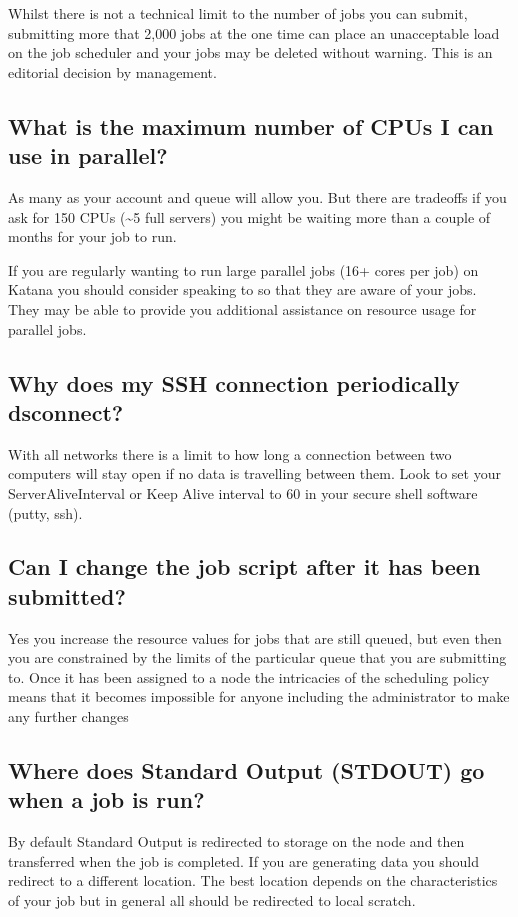 \documentclass[letterpaper,10pt,english]{sphinxmanual}
\begin{document}
Whilst there is not a technical limit to the number of jobs you can submit, submitting more that 2,000 jobs at the one time can place an unacceptable load on the job scheduler and your jobs may be deleted without warning. This is an editorial decision by management.


\subsection{What is the maximum number of CPUs I can use in parallel?}
\label{\detokenize{faq:what-is-the-maximum-number-of-cpus-i-can-use-in-parallel}}
As many as your account and queue will allow you. But there are trade\sphinxhyphen{}offs \sphinxhyphen{} if you ask for 150 CPUs (\textasciitilde{}5 full servers) you might be waiting more than a couple of months for your job to run.

If you are regularly wanting to run large parallel jobs (16+ cores per job) on Katana you should consider speaking to {\hyperref[\detokenize{help_and_support:help-and-support}]{}} so that they are aware of your jobs. They may be able to provide you additional assistance on resource usage for parallel jobs.


\subsection{Why does my SSH connection periodically dsconnect?}
\label{\detokenize{faq:why-does-my-ssh-connection-periodically-dsconnect}}
With all networks there is a limit to how long a connection between two computers will stay open if no data is travelling between them. Look to set your ServerAliveInterval or Keep Alive interval to 60 in your secure shell software (putty, ssh).


\subsection{Can I change the job script after it has been submitted?}
\label{\detokenize{faq:can-i-change-the-job-script-after-it-has-been-submitted}}
Yes you increase the resource values for jobs that are still queued, but even then you are constrained by the limits of the particular queue that you are submitting to. Once it has been assigned to a node the intricacies of the scheduling policy means that it becomes impossible for anyone including the administrator to make any further changes


\subsection{Where does Standard Output (STDOUT) go when a job is run?}
\label{\detokenize{faq:where-does-standard-output-stdout-go-when-a-job-is-run}}
By default Standard Output is redirected to storage on the node and then transferred when the job is completed. If you are generating data you should redirect  to a different location. The best location depends on the characteristics of your job but in general all  should be redirected to local scratch.
\end{document}
